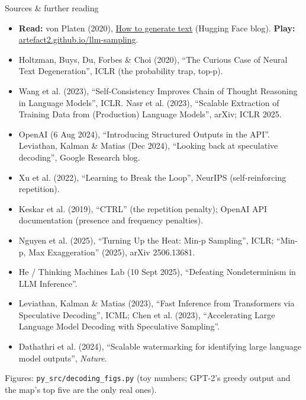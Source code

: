 \documentclass[aspectratio=169]{beamer}
\newcommand{\src}[1]{{\scriptsize\color{gray} #1}}
\newcommand{\link}[2]{\href{#1}{\textcolor{popblue}{#2}}}   %
\begin{document}
\begin{frame}{Sources \& further reading}
  \scriptsize
  \begin{itemize}
    \item \textbf{Read:} von Platen (2020), \link{https://huggingface.co/blog/how-to-generate}{How
      to generate text} (Hugging Face blog). \textbf{Play:}
      \link{https://artefact2.github.io/llm-sampling/}{artefact2.github.io/llm-sampling}.
    \item Holtzman, Buys, Du, Forbes \& Choi (2020), ``The Curious Case of Neural Text
      Degeneration'', ICLR (the probability trap, top-p).
    \item Wang et al. (2023), ``Self-Consistency Improves Chain of Thought Reasoning in Language
      Models'', ICLR. Nasr et al. (2023), ``Scalable Extraction of Training Data from (Production)
      Language Models'', arXiv; ICLR 2025.
    \item OpenAI (6 Aug 2024), ``Introducing Structured Outputs in the API''. Leviathan, Kalman \&
      Matias (Dec 2024), ``Looking back at speculative decoding'', Google Research blog.
    \item Xu et al. (2022), ``Learning to Break the Loop'', NeurIPS (self-reinforcing repetition).
    \item Keskar et al. (2019), ``CTRL'' (the repetition penalty); OpenAI API documentation
      (presence and frequency penalties).
    \item Nguyen et al. (2025), ``Turning Up the Heat: Min-p Sampling'', ICLR; ``Min-p, Max
      Exaggeration'' (2025), arXiv 2506.13681.
    \item He / Thinking Machines Lab (10 Sept 2025), ``Defeating Nondeterminism in LLM
      Inference''.
    \item Leviathan, Kalman \& Matias (2023), ``Fast Inference from Transformers via Speculative
      Decoding'', ICML; Chen et al. (2023), ``Accelerating Large Language Model Decoding with
      Speculative Sampling''.
    \item Dathathri et al. (2024), ``Scalable watermarking for identifying large language model
      outputs'', \emph{Nature}.
  \end{itemize}
  \vskip 2pt
  \src{Figures: \texttt{py\_src/decoding\_figs.py} (toy numbers; GPT-2's greedy output and the
  map's top five are the only real ones).}
\end{frame}
\end{document}
